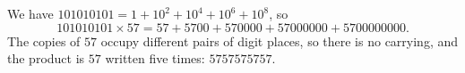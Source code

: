 We have $101010101=1+10^2+10^4+10^6+10^8$, so
\[
101010101\times57=57+5700+570000+57000000+5700000000 .
\]
The copies of $57$ occupy different pairs of digit places, so there is no carrying, and the product is $57$ written five times: $\boxed{5757575757}$.
